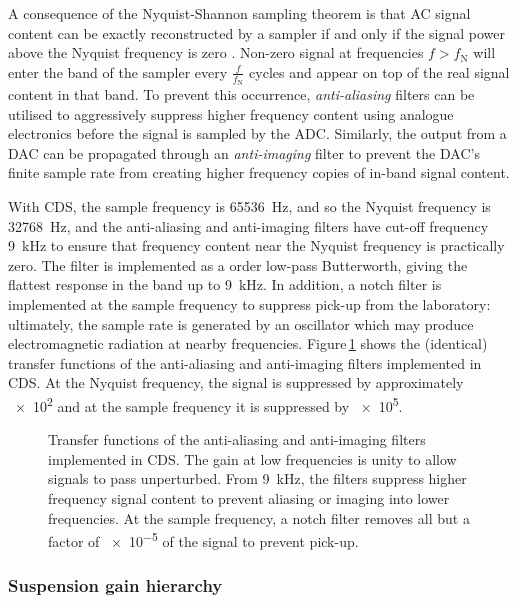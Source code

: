 A consequence of the Nyquist-Shannon sampling theorem is that \gls{AC} signal content can be exactly reconstructed by a sampler if and only if the signal power above the Nyquist frequency is zero \cite{Horowitz2015}. Non-zero signal at frequencies $f > f_{\text{N}}$ will enter the band of the sampler every $\frac{f}{f_{\text{N}}}$ cycles and appear on top of the real signal content in that band. To prevent this occurrence, \emph{anti-aliasing} filters can be utilised to aggressively suppress higher frequency content using analogue electronics before the signal is sampled by the \gls{ADC}. Similarly, the output from a \gls{DAC} can be propagated through an \emph{anti-imaging} filter to prevent the \gls{DAC}'s finite sample rate from creating higher frequency copies of in-band signal content.

With \gls{CDS}, the sample frequency is \SI{65536}{\hertz}, and so the Nyquist frequency is \SI{32768}{\hertz}, and the anti-aliasing and anti-imaging filters have cut-off frequency \SI{9}{\kilo\hertz} to ensure that frequency content near the Nyquist frequency is practically zero. The filter is implemented as a  order low-pass Butterworth, giving the flattest response in the band up to \SI{9}{\kilo\hertz}. In addition, a notch filter is implemented at the sample frequency to suppress pick-up from the laboratory: ultimately, the sample rate is generated by an oscillator which may produce electromagnetic radiation at nearby frequencies. Figure\,\ref{fig:aa-ai-filter-tfs} shows the (identical) transfer functions of the anti-aliasing and anti-imaging filters implemented in \gls{CDS}. At the Nyquist frequency, the signal is suppressed by approximately \SI{e2}{} and at the sample frequency it is suppressed by \SI{e5}{}.

\begin{figure}
  \centering
  
  \caption[Anti-aliasing and anti-imaging filter transfer functions]{\label{fig:aa-ai-filter-tfs}Transfer functions of the anti-aliasing and anti-imaging filters implemented in CDS. The gain at low frequencies is unity to allow signals to pass unperturbed. From \SI{9}{\kilo\hertz}, the filters suppress higher frequency signal content to prevent aliasing or imaging into lower frequencies. At the sample frequency, a notch filter removes all but a factor of \SI{e-5}{} of the signal to prevent pick-up.}
\end{figure}

\subsubsection{\label{sec:sus-gain-hierarchy}Suspension gain hierarchy}

